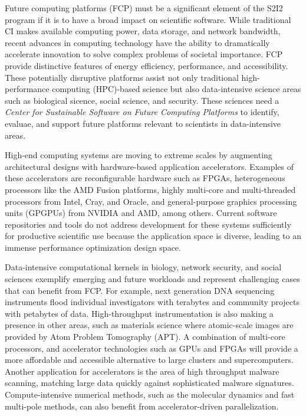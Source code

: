 Future computing platforms (FCP) must be a significant element of the S2I2 program if it is to have a broad impact on scientific software. 
While traditional CI makes available computing power, data storage, and network bandwidth, recent advances in computing technology have the ability to dramatically accelerate innovation to solve complex problems of societal importance. 
FCP provide distinctive features of energy efficiency, performance, and accessibility. 
These potentially disruptive platforms assist not only traditional high-performance computing (HPC)-based science but also data-intensive science areas such as biological sicence, 
social science, and security.  
These sciences need a \textit{Center for Sustainable Software on Future Computing Platforms} to identify, evaluae, and support future platforms relevant to scientists in data-intensive areas.

High-end computing systems are moving to extreme scales by augmenting architectural designs with hardware-based application accelerators. 
Examples of these accelerators are reconfigurable hardware such as FPGAs, heterogeneous processors like the AMD Fusion platforms, 
highly multi-core and multi-threaded processors from Intel, Cray, and Oracle, and general-purpose graphics processing units (GPGPUs) from NVIDIA and AMD, among others. 
Current software repositories and tools do not address development for these systems sufficiently for productive scientific use because the application space is diverse, 
leading to an immense performance optimization design space.

Data-intensive computational kernels in biology, network security, and social sciences exemplify emerging and future workloads and represent challenging cases that can benefit from FCP. 
For example, next generation DNA sequencing instruments flood individual investigators with terabytes and community projects with petabytes of data. 
High-throughput instrumentation is also making a presence in other areas, such as materials science where atomic-scale images are provided by Atom Problem Tomography (APT). 
A combination of multi-core processors, and accelerator technologies such as GPUs and FPGAs will provide a more affordable and accessible alternative to large clusters and supercomputers. 
Another application for accelerators is the area of high throughput malware scanning, matching large data quickly against sophisticated malware signatures. 
Compute-intensive numerical methods, such as the molecular dynamics and fast multi-pole methods, can also benefit from accelerator-driven parallelization.

